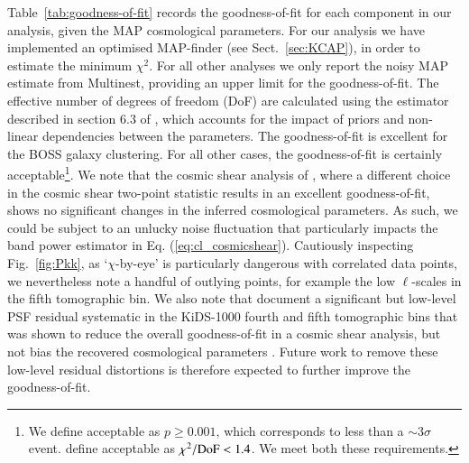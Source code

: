Table~\ref{tab:goodness-of-fit} records the goodness-of-fit for each component in our \tttp analysis, given the MAP cosmological parameters.  For our \tttp analysis we have implemented an optimised MAP-finder (see Sect.~\ref{sec:KCAP}), in order to estimate the minimum $\chi^2$.  For all other analyses we only report the noisy MAP estimate from {\sc Multinest}, providing an upper limit for the goodness-of-fit.  
The effective number of degrees of freedom (DoF) are calculated using the estimator described in section 6.3 of \citet{joachimi/etal:inprep}, which accounts for the impact of priors and non-linear dependencies between the parameters.  
The goodness-of-fit is excellent for the BOSS galaxy clustering.  For all other cases, the goodness-of-fit is certainly acceptable\footnote{We define acceptable as $p \geq 0.001$, which corresponds to less than a $\sim 3\sigma$ event.   \citet{abbott/etal:2018} define acceptable as $\chi^2/{\rm DoF} < 1.4$.  We meet both these requirements.}.
We note that the cosmic shear analysis of \citet{asgari/etal:inprep}, where a different choice in the cosmic shear two-point statistic results in an excellent goodness-of-fit, shows no significant changes in the inferred cosmological parameters.    As such, we could be subject to an unlucky noise fluctuation that particularly impacts the band power estimator in Eq. (\ref{eq:cl_cosmicshear}).  Cautiously inspecting Fig.~\ref{fig:Pkk}, as `$\chi$-by-eye' is particularly dangerous with correlated data points, we nevertheless note a handful of outlying points, for example the low $\ell$-scales in the fifth tomographic bin.   We also note that \citet{giblin/etal:inprep} document a significant but low-level PSF residual systematic in the KiDS-1000 fourth and fifth tomographic bins that was shown to reduce the overall goodness-of-fit in a cosmic shear analysis, but not bias the recovered cosmological parameters \citep[see also the discussion in][]{amara/refregier:2008}.  Future work to remove these low-level residual distortions is therefore expected to further improve the goodness-of-fit.

